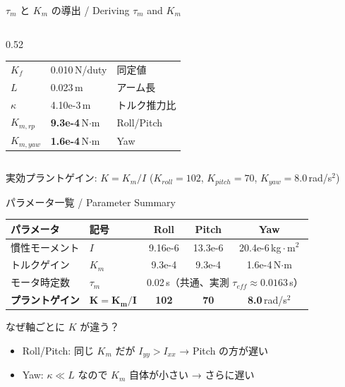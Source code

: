 \begin{frame}{$\tau_m$ と $K_m$ の導出 / Deriving $\tau_m$ and $K_m$}
\begin{columns}[t]
\begin{column}{0.52\textwidth}
      \vspace{-0.2em}
      {\scriptsize
      \begin{tabular}{lll}
        \hline
        $K_f$       & 0.010\,N/duty & 同定値 \\
        $L$         & 0.023\,m & アーム長 \\
        $\kappa$    & 4.10e-3\,m & トルク推力比 \\
        \hline
        $K_{m,rp}$  & \textbf{9.3e-4}\,N$\cdot$m & Roll/Pitch \\
        $K_{m,yaw}$ & \textbf{1.6e-4}\,N$\cdot$m & Yaw \\
        \hline
      \end{tabular}}
    \end{column}
  \end{columns}

  \vspace{0.5em}
  \centering
  実効プラントゲイン: \; $K = K_m / I$
  \quad ($K_{roll}\!=\!102$,\; $K_{pitch}\!=\!70$,\; $K_{yaw}\!=\!8.0$\,rad/s$^2$)
\end{frame}

\begin{frame}{パラメータ一覧 / Parameter Summary}
  \begin{table}
    \centering
    \begin{tabular}{llccc}
      \hline
      \textbf{パラメータ} & \textbf{記号} & \textbf{Roll} & \textbf{Pitch} & \textbf{Yaw} \\
      \hline
      慣性モーメント & $I$ & 9.16e-6 & 13.3e-6 & 20.4e-6\,kg\,$\cdot$\,m$^2$ \\
      トルクゲイン & $K_m$ & 9.3e-4 & 9.3e-4 & 1.6e-4\,N$\cdot$m \\
      モータ時定数 & $\tau_m$ & \multicolumn{3}{c}{0.02\,s（共通、実測 $\tau_{eff}\!\approx\!0.0163$\,s）} \\
      \hline
      \textbf{プラントゲイン} & $\bm{K = K_m/I}$
        & \textbf{102} & \textbf{70} & \textbf{8.0}\,rad/s$^2$ \\
      \hline
    \end{tabular}
  \end{table}

  \vspace{0.5em}

  \begin{exampleblock}{なぜ軸ごとに $K$ が違う？}
    \begin{itemize}
      \item Roll/Pitch: 同じ $K_m$ だが $I_{yy} > I_{xx}$ → Pitch の方が遅い
      \item Yaw: $\kappa \ll L$ なので $K_m$ 自体が小さい → さらに遅い
    \end{itemize}
  \end{exampleblock}
\end{frame}

